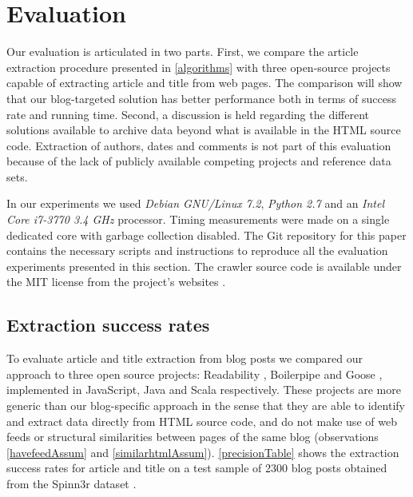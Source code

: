 \section{Evaluation}\label{evaluation}

Our evaluation is articulated in two parts. First, we compare the article extraction procedure presented in \autoref{algorithms} with three open-source projects capable of extracting article and title from web pages. The comparison will show that our blog-targeted solution has better performance both in terms of success rate and running time. Second, a discussion is held regarding the different solutions available to archive data beyond what is available in the HTML source code. Extraction of authors, dates and comments is not part of this evaluation because of the lack of publicly available competing projects and reference data sets.

In our experiments we used \emph{Debian GNU/Linux 7.2}, \emph{Python 2.7} and an \emph{Intel Core i7-3770 3.4 GHz} processor. Timing measurements were made on a single dedicated core with garbage collection disabled. The Git repository for this paper \cite{repositoryofthispaper} contains the necessary scripts and instructions to reproduce all the evaluation experiments presented in this section. The crawler source code is available under the MIT license from the project's websites \cite{blogforevercrawler}.

\subsection{Extraction success rates}
To evaluate article and title extraction from blog posts we compared our approach to three open source projects: Readability \cite{python-readability2011}, Boilerpipe \cite{kohlschuetter2010} and Goose \cite{goose2012}, implemented in JavaScript, Java and Scala respectively. These projects are more generic than our blog-specific approach in the sense that they are able to identify and extract data directly from HTML source code, and do not make use of web feeds or structural similarities between pages of the same blog (observations \ref{havefeedAssum} and \ref{similarhtmlAssum}). \autoref{precisionTable} shows the extraction success rates for article and title on a test sample of 2300 blog posts obtained from the Spinn3r dataset \cite{burton2011}.



